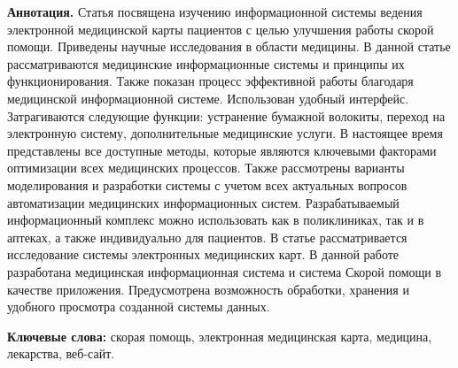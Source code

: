 {\bfseries Аннотация.} Статья посвящена изучению информационной системы
ведения электронной медицинской карты пациентов с целью улучшения работы
скорой помощи. Приведены научные исследования в области медицины. В
данной статье рассматриваются медицинские информационные системы и
принципы их функционирования. Также показан процесс эффективной работы
благодаря медицинской информационной системе. Использован удобный
интерфейс. Затрагиваются следующие функции: устранение бумажной
волокиты, переход на электронную систему, дополнительные медицинские
услуги. В настоящее время представлены все доступные методы, которые
являются ключевыми факторами оптимизации всех медицинских процессов.
Также рассмотрены варианты моделирования и разработки системы с учетом
всех актуальных вопросов автоматизации медицинских информационных
систем. Разрабатываемый информационный комплекс можно использовать как в
поликлиниках, так и в аптеках, а также индивидуально для пациентов. В
статье рассматривается исследование системы электронных медицинских
карт. В данной работе разработана медицинская информационная система и
система Скорой помощи в качестве приложения. Предусмотрена возможность
обработки, хранения и удобного просмотра созданной системы данных.

{\bfseries Ключевые слова:} скорая помощь, электронная медицинская карта,
медицина, лекарства, веб-сайт.

